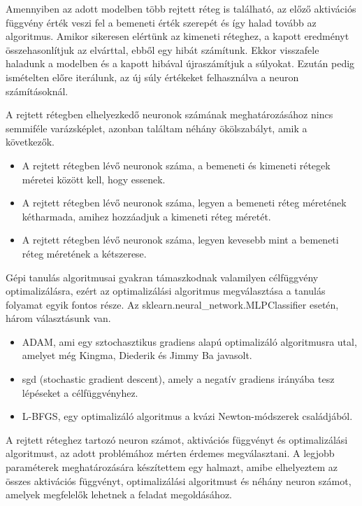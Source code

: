 Amennyiben az adott modelben több rejtett réteg is található, az előző aktivációs függvény érték veszi fel a bemeneti érték szerepét és így halad tovább az algoritmus. Amikor sikeresen elértünk az kimeneti réteghez, a kapott eredményt összehasonlítjuk az elvárttal, ebből egy hibát számítunk.
Ekkor visszafele haladunk a modelben és a kapott hibával újraszámítjuk a súlyokat.
Ezután pedig ismételten előre iterálunk, az új súly értékeket felhasználva a neuron számításoknál.

A rejtett rétegben elhelyezkedő neuronok számának meghatározásához nincs semmiféle varázsképlet, azonban találtam néhány ökölszabályt, amik a következők. 
\begin{itemize}
\item A rejtett rétegben lévő neuronok száma, a bemeneti és kimeneti rétegek méretei között kell, hogy essenek.
\item A rejtett rétegben lévő neuronok száma, legyen a bemeneti réteg méretének kétharmada, amihez hozzáadjuk a kimeneti réteg méretét.
\item A rejtett rétegben lévő neuronok száma, legyen kevesebb mint a bemeneti réteg méretének a kétszerese.
\end{itemize}

Gépi tanulás algoritmusai gyakran támaszkodnak valamilyen célfüggvény optimalizálásra, ezért az optimalizálási algoritmus megválasztása a tanulás folyamat egyik fontos része.
Az sklearn.neural\_network.MLPClassifier esetén, három választásunk van.
\begin{itemize}
\item ADAM, ami egy sztochasztikus gradiens alapú optimalizáló algoritmusra utal, amelyet még Kingma, Diederik és Jimmy Ba javasolt.
\item sgd (stochastic gradient descent), amely a negatív gradiens irányába tesz lépéseket a célfüggvényhez.
\item L-BFGS, egy  optimalizáló algoritmus a kvázi Newton-módszerek családjából.

\end{itemize}

A rejtett réteghez tartozó neuron számot, aktivációs függvényt és optimalizálási algoritmust, az adott problémához mérten érdemes megválasztani. A legjobb paraméterek meghatározására készítettem egy halmazt, amibe elhelyeztem az összes aktivációs függvényt, optimalizálási algoritmust és néhány neuron számot, amelyek megfelelők lehetnek a feladat megoldásához.

